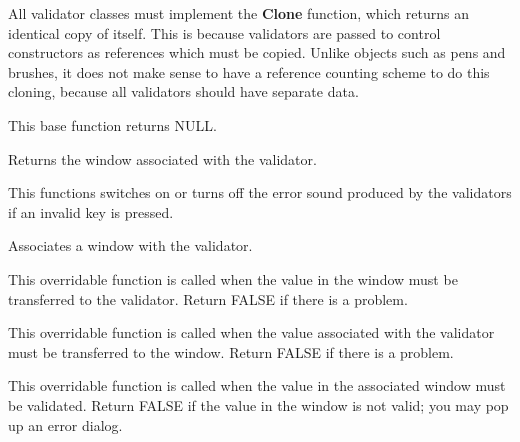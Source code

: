 
All validator classes must implement the {\bf Clone} function, which returns
an identical copy of itself. This is because validators are passed to control
constructors as references which must be copied. Unlike objects such as pens
and brushes, it does not make sense to have a reference counting scheme
to do this cloning, because all validators should have separate
data.

This base function returns NULL.

\label{wxvalidatorgetwindow}


Returns the window associated with the validator.



This functions switches on or turns off the error sound produced by the
validators if an invalid key is pressed.

\label{wxvalidatorsetwindow}


Associates a window with the validator.

\label{wxvalidatortransferfromwindow}


This overridable function is called when the value in the window must be
transferred to the validator. Return FALSE if there is a problem.

\label{wxvalidatortransfertowindow}


This overridable function is called when the value associated with the validator must be
transferred to the window. Return FALSE if there is a problem.

\label{wxvalidatorvalidate}


This overridable function is called when the value in the associated window must be validated.
Return FALSE if the value in the window is not valid; you may pop up an error dialog.


